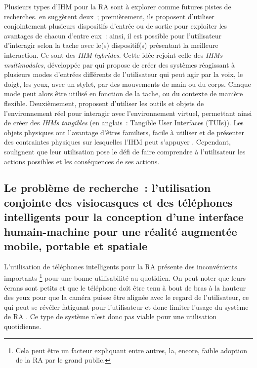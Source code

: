 Plusieurs types d'IHM pour la RA sont à explorer comme futures pistes de recherches. \citet{AzumaBaillotBehringerEtAl2001} en suggèrent deux~; premièrement, ils proposent d'utiliser conjointement plusieurs dispositifs d'entrée ou de sortie pour exploiter les avantages de chacun d'entre eux~: ainsi, il est possible pour l'utilisateur d'interagir selon la tache avec le(s) dispositif(s) présentant la meilleure interaction. Ce sont des \emph{IHM hybrides}. \citep{ZhouDuhBillinghurst2008}  Cette idée rejoint celle des \emph{IHMs multimodales}, développée par \citet{Oviatt2003} qui propose de créer des systèmes réagissant à plusieurs modes d'entrées différents de l'utilisateur qui peut agir par la voix, le doigt, les yeux, avec un stylet, par des mouvements de main ou du corps. Chaque mode peut alors être utilisé en fonction de la tache, ou du contexte de manière flexible. \citep{CarmignianiFurhtAnisettiEtAl2011} Deuxièmement, \citet{AzumaBaillotBehringerEtAl2001} proposent d'utiliser les outils et objets de l'environnement réel pour interagir avec l'environnement virtuel, permettant ainsi de créer des \emph{IHMs tangibles} (en anglais~: \foreignlanguage{english}{Tangible User Interfaces (TUIs)}). Les objets physiques ont l'avantage d'êtres familiers, facile à utiliser et de présenter des contraintes physiques sur lesquelles l'IHM peut s'appuyer \citep{ZhouDuhBillinghurst2008}. Cependant, \citeauthor{ZhouDuhBillinghurst2008} soulignent que leur utilisation pose le défi de faire comprendre à l'utilisateur les actions possibles et les conséquences de ses actions. 


\subsection*{Le problème de recherche~: l'utilisation conjointe des visiocasques et des téléphones intelligents pour la conception d'une interface humain-machine pour une réalité augmentée mobile, portable et spatiale}
L'utilisation de téléphones intelligents pour la RA présente des inconvénients importants \footnote{Cela peut être un facteur expliquant entre autres, la, encore, faible adoption de la RA par le grand public.} pour une bonne utilisabilité au quotidien. On peut noter que leurs écrans sont petits \citep{DeSaChurchill2013} et que le téléphone doit être tenu à bout de bras à la hauteur des yeux pour que la caméra puisse être alignée avec le regard de l'utilisateur, ce qui peut se révéler fatiguant pour l'utilisateur et donc limiter l'usage du système de RA \citep{Hincapie-RamosGuoMoghadasianEtAl2014}. Ce type de système n'est donc pas viable pour une utilisation quotidienne.

